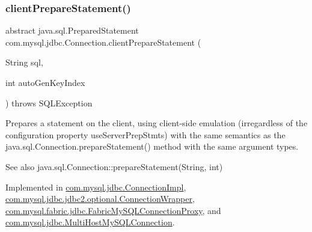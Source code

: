 \subsubsection{\texorpdfstring{client\+Prepare\+Statement()}{clientPrepareStatement()}\hspace{0.1cm}{\footnotesize\ttfamily [2/6]}}
{\footnotesize\ttfamily abstract java.\+sql.\+Prepared\+Statement com.\+mysql.\+jdbc.\+Connection.\+client\+Prepare\+Statement (\begin{DoxyParamCaption}\item[{String}]{sql,  }\item[{int}]{auto\+Gen\+Key\+Index }\end{DoxyParamCaption}) throws S\+Q\+L\+Exception\hspace{0.3cm}{\ttfamily [abstract]}}

Prepares a statement on the client, using client-\/side emulation (irregardless of the configuration property \textquotesingle{}use\+Server\+Prep\+Stmts\textquotesingle{}) with the same semantics as the java.\+sql.\+Connection.\+prepare\+Statement() method with the same argument types.

\begin{DoxySeeAlso}{See also}
java.\+sql.\+Connection\+::prepare\+Statement(\+String, int) 
\end{DoxySeeAlso}


Implemented in \mbox{\hyperlink{classcom_1_1mysql_1_1jdbc_1_1_connection_impl_a5ac2643cdeea74e7b46e0b7f18b980d4}{com.\+mysql.\+jdbc.\+Connection\+Impl}}, \mbox{\hyperlink{classcom_1_1mysql_1_1jdbc_1_1jdbc2_1_1optional_1_1_connection_wrapper_af706fcb5a89569df199c821c64b7d741}{com.\+mysql.\+jdbc.\+jdbc2.\+optional.\+Connection\+Wrapper}}, \mbox{\hyperlink{classcom_1_1mysql_1_1fabric_1_1jdbc_1_1_fabric_my_s_q_l_connection_proxy_a60034988ae9a7aedd702c5228602b721}{com.\+mysql.\+fabric.\+jdbc.\+Fabric\+My\+S\+Q\+L\+Connection\+Proxy}}, and \mbox{\hyperlink{classcom_1_1mysql_1_1jdbc_1_1_multi_host_my_s_q_l_connection_a71d9841bc1d2d9d49980fb98d780c84c}{com.\+mysql.\+jdbc.\+Multi\+Host\+My\+S\+Q\+L\+Connection}}.

\mbox{\label{interfacecom_1_1mysql_1_1jdbc_1_1_connection_a3d058c3722d0afd1cdc4254a9b813c74}} 
